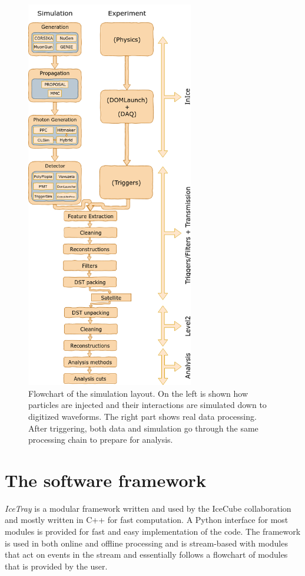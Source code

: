 \begin{figure}
\centering
\includegraphics[width=0.65\textwidth]{chapter6/img/flowchart_extended.png}
\caption{Flowchart of the simulation layout. On the left is shown how particles are injected and their interactions are simulated down to digitized waveforms. The right part shows real data processing. After triggering, both data and simulation go through the same processing chain to prepare for analysis.}
\label{fig:flowchart}
\end{figure}

\section{The software framework}
\textit{IceTray}  is a modular framework written and used by the IceCube collaboration and mostly written in C++ for fast computation. A Python interface for most modules is provided for fast and easy implementation of the code. The framework is used in both online and offline processing and is stream-based with modules that act on events in the stream and essentially follows a flowchart of modules that is provided by the user.\\

